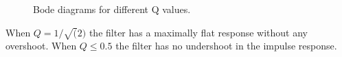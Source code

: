 \begin{figure}
\centerline{
\hfil
{}}
\caption[Bode diagrams for different Q values]{Bode diagrams for different Q values. \label{fig:ICOfilter}}
\end{figure}

When $Q=1/\sqrt(2)$ the filter has a maximally flat response without any overshoot.
When $Q \leq 0.5$ the filter has no undershoot in the impulse response.
